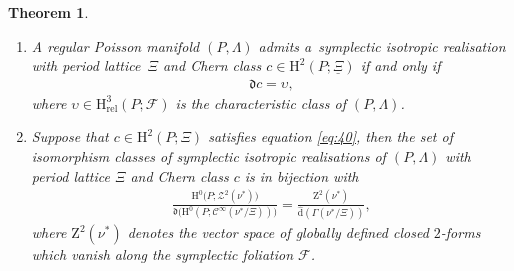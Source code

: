 \documentclass[pdftex]{sigma}
\numberwithin{equation}{section}
\newtheorem{Theorem}{Theorem}[section]
\newcommand{\de}{\mathrm{d}} %
\newcommand{\PM}{(P,\Lambda)} %
\newcommand{\HH}{\mathrm{H}}
\begin{document}
\begin{Theorem}\label{thm:real_sirs}\quad
 \begin{enumerate}[label={\rm \arabic*.}, ref={\rm (\arabic*)}]\itemsep=0pt
\item \label{item:16} A regular Poisson manifold $\PM$ admits a~symplectic isotropic realisation with period lattice~$\Xi$ and Chern class $c \in \HH^2(P;\underline{\Xi})$ if and only if
 \begin{gather} \label{eq:40}
 \mathfrak{d}c = \upsilon,
 \end{gather}
 where $ \upsilon \in \HH_{\mathrm{rel}}^3(P;\mathcal{F})$ is the characteristic class of $\PM$.
 \item \label{item:17} Suppose that $c \in \HH^2(P;\Xi)$ satisfies equation \eqref{eq:40}, then the set of isomorphism classes of symplectic isotropic realisations of $\PM$ with period lattice $\Xi$ and Chern class $c$ is in bijection with
 \begin{gather*}
 \frac{\HH^0\big(P; \mathcal{Z}^2(\nu^*)\big)}{\mathfrak{d} \big(\HH^0 (P;\mathcal{C}^{\infty}(\nu^*/\Xi)
 )\big)} = \frac{\mathrm{Z}^2(\nu^*)}{\hat{\de}(\Gamma(\nu^*/\Xi))},
 \end{gather*}
 where $\mathrm{Z}^2(\nu^*)$ denotes the vector space of globally defined closed $2$-forms which vanish along the symplectic foliation $\mathcal{F}$.
 \end{enumerate}
\end{Theorem}
\end{document}

